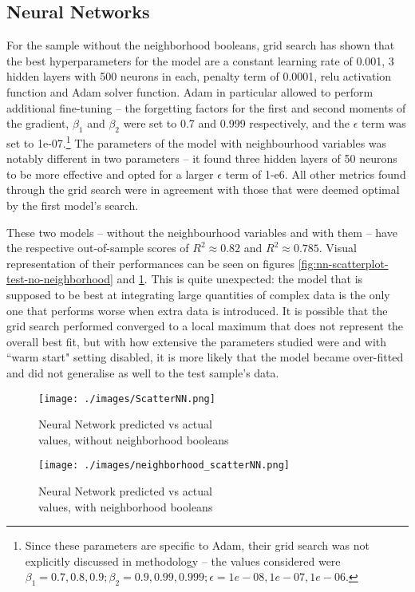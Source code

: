 \documentclass[12pt]{report}
\begin{document}
\subsection{Neural Networks}
For the sample without the neighborhood booleans, grid search has shown that the best hyperparameters for the model are a constant learning rate of 0.001, 3 hidden layers with 500 neurons in each, penalty term of 0.0001, relu activation function and Adam solver function. Adam in particular allowed to perform additional fine-tuning -- the forgetting factors for the first and second moments of the gradient, $\beta_{1}$ and $\beta_{2}$ were set to 0.7 and 0.999 respectively, and the $\epsilon$ term was set to 1e-07.\footnote{Since these parameters are specific to Adam, their grid search was not explicitly discussed in methodology -- the values considered were $\beta_1=0.7, 0.8, 0.9; \beta_2=0.9, 0.99, 0.999; \epsilon=1e-08, 1e-07, 1e-06$.} The parameters of the model with neighbourhood variables was notably different in two parameters -- it found three hidden layers of 50 neurons to be more effective and opted for a larger $\epsilon$ term of 1-e6. All other metrics found through the grid search were in agreement with those that were deemed optimal by the first model's search.

These two models -- without the neighbourhood variables and with them -- have the respective out-of-sample scores of $R^2\approx0.82$ and $R^2\approx0.785$. Visual representation of their performances can be seen on figures \ref{fig:nn-scatterplot-test-no-neighborhood} and \ref{fig:nn-scatterplot-test}. This is quite unexpected: the model that is supposed to be best at integrating large quantities of complex data is the only one that performs worse when extra data is introduced. It is possible that the grid search performed converged to a local maximum that does not represent the overall best fit, but with how extensive the parameters studied were and with ``warm start" setting disabled, it is more likely that the model became over-fitted and did not generalise as well to the test sample's data.


\begin{figure}
	\begin{minipage}[t]{0.47\textwidth}
		\centering
		\texttt{[image: ./images/ScatterNN.png]}
		\caption{Neural Network predicted vs actual \\ values, without neighborhood booleans}
		\label{fig:nn-scatterplot-test-no-neighborhood}
	\end{minipage}
	\begin{minipage}[t]{0.47\textwidth}
		\centering
		\texttt{[image: ./images/neighborhood\_scatterNN.png]}
		\caption{Neural Network predicted vs actual \\ values, with neighborhood booleans}
		\label{fig:nn-scatterplot-test}
	\end{minipage}
\end{figure}
\end{document}
